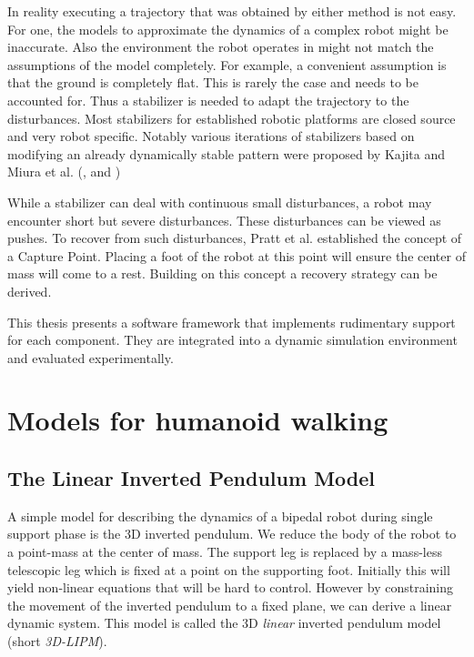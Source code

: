 \documentclass[english,ngerman]{KITreprt}
\begin{document}
In reality executing a trajectory that was obtained by either method is
not easy. For one, the models to approximate the dynamics of a complex
robot might be inaccurate. Also the environment the robot operates in
might not match the assumptions of the model completely. For example, a
convenient assumption is that the ground is completely flat. This is
rarely the case and needs to be accounted for. Thus a stabilizer is
needed to adapt the trajectory to the disturbances. Most stabilizers for
established robotic platforms are closed source and very robot specific.
Notably various iterations of stabilizers based on modifying an already
dynamically stable pattern were proposed by Kajita and Miura et al.
(\cite{kajita2010biped}, \cite{miura2011human} and
\cite{kajita2012evaluation})

While a stabilizer can deal with continuous small disturbances, a robot
may encounter short but severe disturbances. These disturbances can be
viewed as pushes. To recover from such disturbances, Pratt et al.
established the concept of a Capture Point. Placing a foot of the robot
at this point will ensure the center of mass will come to a rest.
Building on this concept a recovery strategy can be derived.

This thesis presents a software framework that implements rudimentary
support for each component. They are integrated into a dynamic
simulation environment and evaluated experimentally.

\chapter{Models for humanoid walking}\label{section:walking-models}

\section{The Linear Inverted Pendulum
Model}\label{the-linear-inverted-pendulum-model}

A simple model for describing the dynamics of a bipedal robot during
single support phase is the 3D inverted pendulum. We reduce the body of
the robot to a point-mass at the center of mass. The support leg is
replaced by a mass-less telescopic leg which is fixed at a point on the
supporting foot. Initially this will yield non-linear equations that
will be hard to control. However by constraining the movement of the
inverted pendulum to a fixed plane, we can derive a linear dynamic
system. This model is called the 3D \emph{linear} inverted pendulum
model (short \emph{3D-LIPM}).
\end{document}
